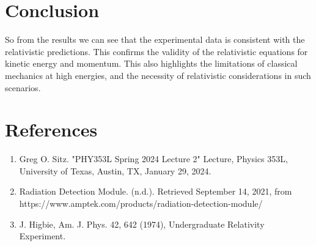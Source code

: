 \documentclass[12pt]{article}
\begin{document}
\section{Conclusion}
        So from the results we can see that the experimental data is consistent with the relativistic predictions. This confirms the validity of the relativistic equations for kinetic energy and momentum. This also highlights the limitations of classical mechanics at high energies, and the necessity of relativistic considerations in such scenarios.


\section{References}
    \begin{enumerate}
        \item Greg O. Sitz. "PHY353L Spring 2024 Lecture 2" Lecture, Physics 353L, University of Texas, Austin, TX, January 29, 2024.
        \item Radiation Detection Module. (n.d.). Retrieved September 14, 2021, from https://www.amptek.com/products/radiation-detection-module/
        \item J. Higbie, Am. J. Phys. 42, 642 (1974), Undergraduate Relativity Experiment.
    \end{enumerate}
\end{document}
